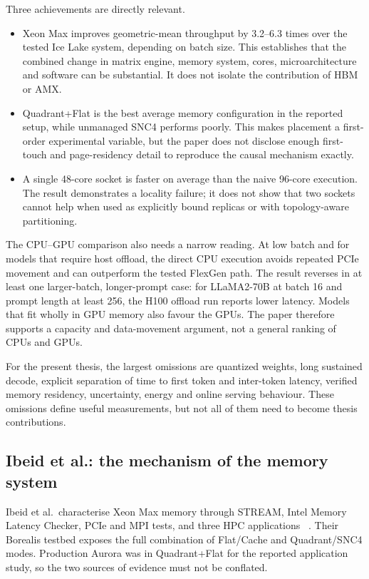 Three achievements are directly relevant.

\begin{itemize}
  \item Xeon Max improves geometric-mean throughput by 3.2--6.3 times
        over the tested Ice Lake system, depending on batch size.
        This establishes that the combined change in matrix engine,
        memory system, cores, microarchitecture and software can be
        substantial.  It does not isolate the contribution of HBM or
        AMX.
  \item Quadrant+Flat is the best average memory configuration in the
        reported setup, while unmanaged SNC4 performs poorly.  This
        makes placement a first-order experimental variable, but the
        paper does not disclose enough first-touch and page-residency
        detail to reproduce the causal mechanism exactly.
  \item A single 48-core socket is faster on average than the naive
        96-core execution.  The result demonstrates a locality failure;
        it does not show that two sockets cannot help when used as
        explicitly bound replicas or with topology-aware partitioning.
\end{itemize}

The CPU--GPU comparison also needs a narrow reading.  At low batch and
for models that require host offload, the direct CPU execution avoids
repeated PCIe movement and can outperform the tested FlexGen path.  The
result reverses in at least one larger-batch, longer-prompt case:
for LLaMA2-70B at batch 16 and prompt length at least 256, the H100
offload run reports lower latency.  Models that fit wholly in GPU memory
also favour the GPUs.  The paper therefore supports a capacity and
data-movement argument, not a general ranking of CPUs and GPUs.

For the present thesis, the largest omissions are quantized weights,
long sustained decode, explicit separation of time to first token and
inter-token latency, verified memory residency, uncertainty, energy and
online serving behaviour.  These omissions define useful measurements,
but not all of them need to become thesis contributions.

\subsection{Ibeid et al.: the mechanism of the memory system}
\label{sec:ibeid-critical}

Ibeid et al.\ characterise Xeon Max memory through STREAM, Intel Memory
Latency Checker, PCIe and MPI tests, and three HPC applications
~\cite{ibeid2025aurora}.  Their Borealis testbed exposes the full
combination of Flat/Cache and Quadrant/SNC4 modes.  Production Aurora
was in Quadrant+Flat for the reported application study, so the two
sources of evidence must not be conflated.

